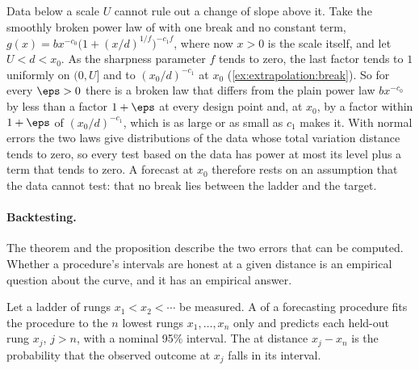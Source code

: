 \begin{refsection}
\begin{remark}\label{rem:extrapolation:break}
Data below a scale $U$ cannot rule out a change of slope above it. Take the smoothly broken power law of \textcite{CaballeroEtAl2023} with one break and no constant term, $g(x)=bx^{-c_0}\bigl(1+(x/d)^{1/f}\bigr)^{-c_1f}$, where now $x>0$ is the scale itself, and let $U<d<x_0$. As the sharpness parameter $f$ tends to zero, the last factor tends to $1$ uniformly on $(0,U]$ and to $(x_0/d)^{-c_1}$ at $x_0$ (\cref{ex:extrapolation:break}). So for every $\eps>0$ there is a broken law that differs from the plain power law $bx^{-c_0}$ by less than a factor $1+\eps$ at every design point and, at $x_0$, by a factor within $1+\eps$ of $(x_0/d)^{-c_1}$, which is as large or as small as $c_1$ makes it. With normal errors the two laws give distributions of the data whose total variation distance tends to zero, so every test based on the data has power at most its level plus a term that tends to zero. A forecast at $x_0$ therefore rests on an assumption that the data cannot test: that no break lies between the ladder and the target.
\end{remark}

\paragraph{Backtesting.} The theorem and the proposition describe the two errors that can be computed. Whether a procedure's intervals are honest at a given distance is an empirical question about the curve, and it has an empirical answer.

\begin{definition}\label{def:extrapolation:backtest}
Let a ladder of rungs $x_1<x_2<\cdots$ be measured. A  of a forecasting procedure fits the procedure to the $n$ lowest rungs $x_1,\dots,x_n$ only and predicts each held-out rung $x_j$, $j>n$, with a nominal 95\% interval. The  at distance $x_j-x_n$ is the probability that the observed outcome at $x_j$ falls in its interval.
\end{definition}


\end{refsection}
